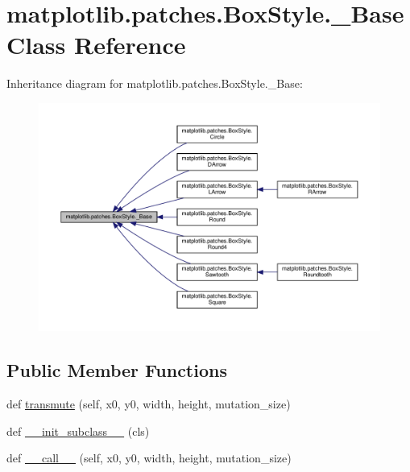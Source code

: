 \hypertarget{classmatplotlib_1_1patches_1_1BoxStyle_1_1__Base}{}\section{matplotlib.\+patches.\+Box\+Style.\+\_\+\+Base Class Reference}
\label{classmatplotlib_1_1patches_1_1BoxStyle_1_1__Base}


Inheritance diagram for matplotlib.\+patches.\+Box\+Style.\+\_\+\+Base\+:
\nopagebreak
\begin{figure}[H]
\begin{center}
\leavevmode
\includegraphics[width=350pt]{classmatplotlib_1_1patches_1_1BoxStyle_1_1__Base__inherit__graph}
\end{center}
\end{figure}
\subsection*{Public Member Functions}
\begin{DoxyCompactItemize}
\item 
def \hyperlink{classmatplotlib_1_1patches_1_1BoxStyle_1_1__Base_a36da6e983df703c4a533991fc41508be}{transmute} (self, x0, y0, width, height, mutation\+\_\+size)
\item 
def \hyperlink{classmatplotlib_1_1patches_1_1BoxStyle_1_1__Base_aafcc297fae4af42b9859b7722cde7361}{\+\_\+\+\_\+init\+\_\+subclass\+\_\+\+\_\+} (cls)
\item 
def \hyperlink{classmatplotlib_1_1patches_1_1BoxStyle_1_1__Base_a2330800b02faf0cbd1f53243a9d69348}{\+\_\+\+\_\+call\+\_\+\+\_\+} (self, x0, y0, width, height, mutation\+\_\+size)
\end{DoxyCompactItemize}



